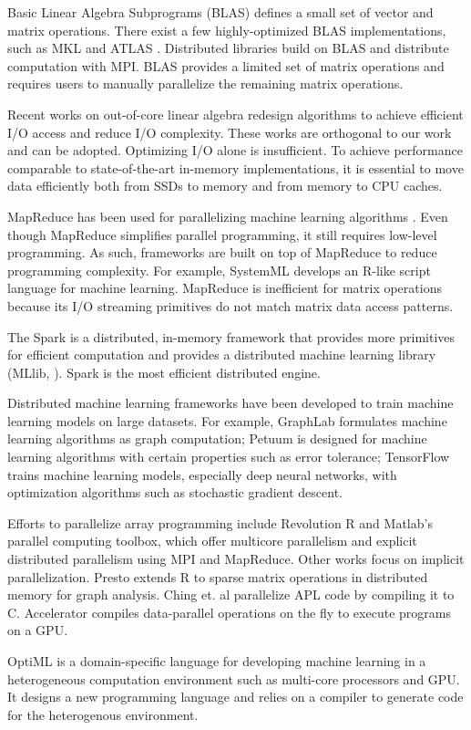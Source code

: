 Basic Linear Algebra Subprograms (BLAS) defines a small set of vector and
matrix operations. There exist a few highly-optimized BLAS implementations,
such as MKL \cite{mkl} and ATLAS \cite{atlas}. 
Distributed libraries \cite{trilinos, petsc, elemental}
build on BLAS and distribute computation with MPI.
BLAS provides a limited set of matrix operations and requires
users to manually parallelize the remaining matrix operations.

Recent works on out-of-core linear algebra \cite{Toledo99, Quintana-Orti12}
redesign algorithms to achieve efficient I/O access and reduce I/O
complexity. These works are orthogonal to our work and can be adopted.
Optimizing I/O
alone is insufficient. To achieve performance comparable to state-of-the-art
in-memory implementations, it is essential to move data efficiently both from
SSDs to memory and from memory to CPU caches.

MapReduce \cite{mapreduce} has been used for parallelizing machine learning
algorithms \cite{Chu06}. Even though MapReduce simplifies parallel programming,
it still requires low-level programming.
As such, frameworks are built on top of MapReduce to reduce programming complexity.
For example, SystemML \cite{systemml} develops an R-like script language for
machine learning. MapReduce is inefficient for matrix operations because
its I/O streaming primitives do not match matrix data access patterns.

The Spark \cite{spark} is a distributed, in-memory framework that provides more
primitives for efficient computation and provides a distributed machine
learning library (MLlib, \cite{mllib}).
Spark is the most efficient distributed engine.

Distributed machine learning frameworks have been developed to train machine
learning models on large datasets. For example, GraphLab \cite{graphlab}
formulates machine learning algorithms as graph computation; Petuum \cite{petuum}
is designed for machine learning algorithms with certain properties such as
error tolerance; TensorFlow \cite{tensorflow} trains machine learning models,
especially deep neural networks, with optimization algorithms such as
stochastic gradient descent.

Efforts to parallelize array programming include Revolution R \cite{rro} and
Matlab's parallel computing toolbox, which offer multicore parallelism and
explicit distributed parallelism using MPI and MapReduce. Other works focus
on implicit parallelization. Presto \cite{presto} extends R to sparse matrix
operations in distributed memory for graph
analysis. Ching et. al \cite{Ching12} parallelize APL code by
compiling it to C. Accelerator \cite{accelerator} compiles
data-parallel operations on the fly to execute programs on a GPU.

OptiML \cite{optiml} is a domain-specific language for developing machine
learning in a heterogeneous computation environment such as multi-core
processors and GPU. It designs a new programming language and relies on
a compiler to generate code for the heterogenous environment.
